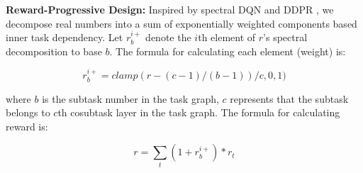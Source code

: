 \documentclass[10pt, conference, letterpaper]{IEEEtran}
\begin{document}






\textbf{Reward-Progressive Design:} Inspired by spectral DQN \cite{dann2021adapting} and DDPR \cite{tang2018deep}, we decompose real numbers into a sum of exponentially weighted components based inner task dependency. Let $r^{i+}_b$ denote the $i$th element of $r$'s spectral decomposition to base $b$. The formula for calculating each element (weight) is:

\begin{equation}
r^{i+}_b = clamp( r -(c - 1)/(b - 1) )/c, 0, 1)
\end{equation}

where $b$ is the subtask number in the task graph, $c$ represents that the subtask belongs to $c$th cosubtask layer in the task graph. The formula for calculating reward is:

\begin{equation}
r = \sum_{t} ( 1 + r^{i+}_b ) * r_{t}
\end{equation}

\end{document}
